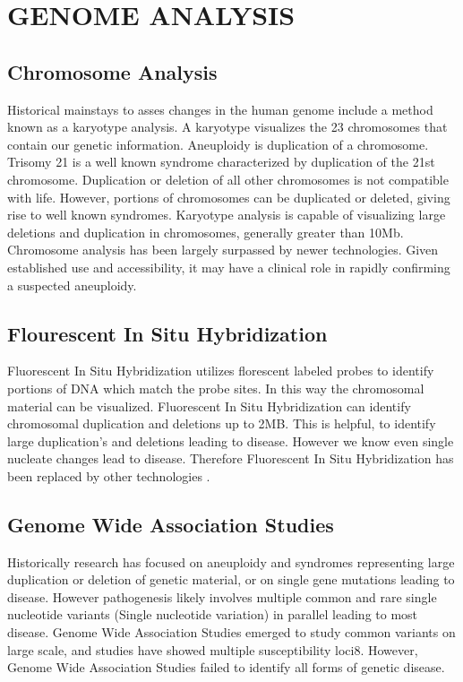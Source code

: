 \documentclass[sigconf]{acmart}
\begin{document}
\section{	GENOME ANALYSIS}

\subsection{Chromosome Analysis}
Historical mainstays to asses changes in the human genome include a method known as a karyotype analysis.  A karyotype visualizes the 23 chromosomes that contain our genetic information.    Aneuploidy is duplication of a chromosome.  Trisomy 21 is a well known syndrome characterized by duplication of the 21st chromosome.  Duplication or deletion of all other chromosomes is not compatible with life. However, portions of chromosomes can be duplicated or deleted, giving rise to well known syndromes.  Karyotype analysis is capable of visualizing large deletions and duplication in chromosomes, generally greater than 10Mb. Chromosome analysis has been largely surpassed by newer technologies.  Given established use and accessibility, it may have a clinical role in rapidly confirming a suspected aneuploidy. 

\subsection{Flourescent In Situ Hybridization}
Fluorescent In Situ Hybridization utilizes florescent labeled probes to identify portions of DNA which match the probe sites. In this way the chromosomal material can be visualized.   Fluorescent In Situ Hybridization can identify chromosomal duplication and deletions up to 2MB.  This is helpful, to identify large duplication's and deletions leading to disease.  However we know even single nucleate changes lead to disease. Therefore Fluorescent In Situ Hybridization has been replaced by other technologies \cite{amann2008single}.      

\subsection{Genome Wide Association Studies}
Historically research has focused on aneuploidy and syndromes representing large duplication or deletion of genetic material, or on single gene mutations leading to disease.  However pathogenesis likely involves multiple common and rare single nucleotide variants (Single nucleotide variation) in parallel leading to most disease.  Genome Wide Association Studies  emerged to study common variants on large scale, and studies have showed multiple susceptibility loci8.  However,  Genome Wide Association Studies failed to identify all forms of genetic disease\cite{visscher2012five}. 
\end{document}
